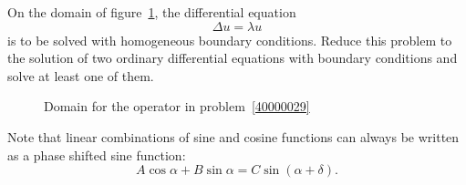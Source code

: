 On the domain of figure~\ref{40000029:domain}, the differential equation
\[
\Delta u = \lambda u
\]
is to be solved with homogeneous boundary conditions.
Reduce this problem to the solution of two ordinary differential equations
with boundary conditions and solve at least one of them.
\begin{figure}[h]
\centering
{}
\caption{Domain for the operator in problem~\ref{40000029}
\label{40000029:domain}}
\end{figure}

\begin{hinweis}
Note that linear combinations of sine and cosine functions can
always be written as a phase shifted sine function:
\[
A\cos \alpha + B \sin \alpha =  C \sin(\alpha+\delta).
\]
\end{hinweis}

